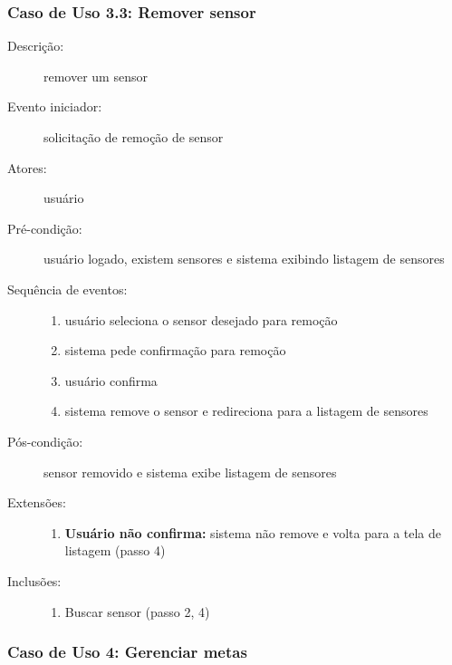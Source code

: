 \subsubsection{Caso de Uso 3.3: Remover sensor}
\begin{description}
	\item[Descrição:] remover um sensor
	\item[Evento iniciador:] solicitação de remoção de sensor
	\item[Atores:] usuário
	\item[Pré-condição:] usuário logado, existem sensores e sistema exibindo listagem de sensores
	\item[Sequência de eventos:] \hfill
		\begin{enumerate}
			\item{usuário seleciona o sensor desejado para remoção}
			\item{sistema pede confirmação para remoção}
			\item{usuário confirma}
			\item{sistema remove o sensor e redireciona para a listagem de sensores}
		\end{enumerate}
	\item[Pós-condição:] sensor removido e sistema exibe listagem de sensores
	\item[Extensões:] \hfill
		\begin{enumerate}
			\item{\textbf{Usuário não confirma:} sistema não remove e volta para a tela de listagem (passo 4)}
		\end{enumerate}
	\item[Inclusões:] \hfill
		\begin{enumerate}
			\item{Buscar sensor (passo 2, 4)}
		\end{enumerate}
\end{description}
\subsubsection{Caso de Uso 4: Gerenciar metas}
